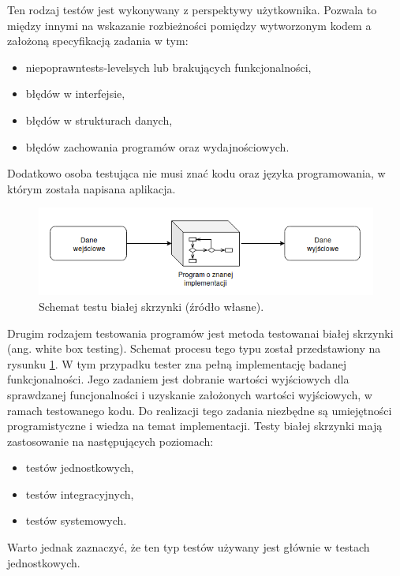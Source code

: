 Ten rodzaj testów jest wykonywany z perspektywy użytkownika.
Pozwala to między innymi na wskazanie rozbieżności pomiędzy wytworzonym kodem a założoną specyfikacją zadania w tym:
\begin {itemize}
\item niepoprawntests-levelsych lub brakujących funkcjonalności,
\item błędów w interfejsie,
\item błędów w strukturach danych,
\item błędów zachowania programów oraz wydajnościowych.
\end{itemize}
Dodatkowo osoba testująca nie musi znać kodu oraz języka programowania, w którym została napisana aplikacja.

\begin{figure}[h]
    \centering
    \includegraphics[width = 13cm]{chapter01/white-box.png}
    \caption{Schemat testu białej skrzynki (źródło własne).}
    \label{fig:white-box}
\end{figure}

Drugim rodzajem testowania programów jest metoda testowanai białej skrzynki (ang. white box testing).
Schemat procesu tego typu został przedstawiony na rysunku \ref{fig:white-box}.
W tym przypadku tester zna pełną implementację badanej funkcjonalności.
Jego zadaniem jest dobranie wartości wyjściowych dla sprawdzanej funcjonalności i uzyskanie założonych wartości wyjściowych, w ramach testowanego kodu.
Do realizacji tego zadania niezbędne są umiejętności programistyczne i wiedza na temat implementacji.
Testy białej skrzynki mają zastosowanie na następujących poziomach:
\begin{itemize}
\item testów jednostkowych,
\item testów integracyjnych,
\item testów systemowych.
\end{itemize}
Warto jednak zaznaczyć, że ten typ testów używany jest głównie w testach jednostkowych.

